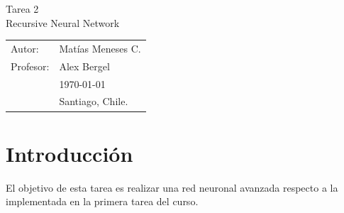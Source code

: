 \documentclass[11pt,letterpaper]{article}
\begin{document}
\newpage
\pagestyle{fancy}
\fancyhf{}
\vspace*{6cm}
\begin{center}
\Huge  {Tarea 2}\\
\vspace{1cm}
\huge {Recursive Neural Network}\\
\end{center}
\vfill
\begin{flushright}
\begin{tabular}{ll}
Autor: & Matías Meneses C.\\
Profesor: & Alex Bergel\\
& \today\\
& Santiago, Chile.
\end{tabular}
\end{flushright}

\newpage
\pagestyle{fancy}
\fancyhf{}

\fancyhead[R]{\small \rm \textbf{\thepage}} %



\renewcommand{\sectionmark}[1]{\markright{\thesection.\ #1}}
\renewcommand{\headrulewidth}{0.5pt}
\renewcommand{\footrulewidth}{0.5pt}


\tableofcontents

\newpage
\section{Introducción}
El objetivo de esta tarea es realizar una red neuronal avanzada respecto a 
la implementada en la primera tarea del curso.\\
\end{document}
